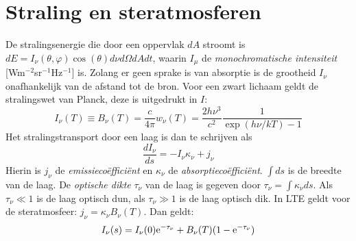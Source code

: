 \section{Straling en steratmosferen}
De stralingsenergie die door een oppervlak $dA$ stroomt is
$dE=I_\nu(\theta,\varphi)\cos(\theta)d\nu d\Omega dAdt$, waarin $I_\mu$ de
{\it monochromatische intensiteit} [Wm$^{-2}$sr$^{-1}$Hz$^{-1}$] is.
Zolang er geen sprake is van absorptie is de grootheid $I_\nu$ onafhankelijk
van de afstand tot de bron. Voor een zwart lichaam geldt de stralingswet van
Planck, deze is uitgedrukt in $I$:
\[
I_\nu(T)\equiv B_\nu(T)=\frac{c}{4\pi}w_\nu(T)=\frac{2h\nu^3}{c^2}\frac{1}{\exp(h\nu/kT)-1}
\]
Het stralingstransport door een laag is dan te schrijven als
\[
\frac{dI_\nu}{ds}=-I_\nu\kappa_\nu+j_\nu
\]
Hierin is $j_\nu$ de {\it emissieco\"effici\"ent} en $\kappa_\nu$ de
{\it absorptieco\"effici\"ent}. $\int ds$ is de breedte van de laag. De
{\it optische dikte} $\tau_\nu$ van de laag is gegeven door
$\tau_\nu=\int\kappa_\nu ds$. Als $\tau_\nu\ll1$ is de laag optisch dun, als
$\tau_\nu\gg1$ is de laag optisch dik. In LTE geldt voor de steratmosfeer:
$j_\nu=\kappa_\nu B_\nu(T)$. Dan geldt:
\[
I_\nu(s)=I_\nu(0){\rm e}^{-\tau_\nu}+B_\nu(T)(1-{\rm e}^{-\tau_\nu})
\]

